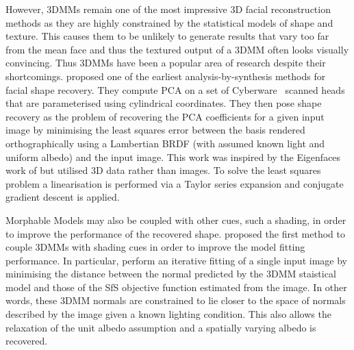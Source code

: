 However, 3DMMs remain one of the most impressive 3D facial reconstruction
methods as they are highly constrained by the statistical models
of shape and texture. This causes them to be unlikely to generate results
that vary too far from the mean face and thus the textured output of a 3DMM
often looks visually convincing. Thus 3DMMs have been a popular area of
research despite their shortcomings.
\cite{atick1996statistical} proposed one of the earliest analysis-by-synthesis
methods for facial shape recovery. They compute PCA on a set of
Cyberware~\cite{cyberware} scanned heads that are parameterised using
cylindrical coordinates. They then pose shape recovery as the problem
of recovering the PCA coefficients for a given input image by minimising
the least squares error between the basis rendered orthographically
using a Lambertian BRDF (with assumed known light and uniform albedo)
and the input image. This work was inspired by the Eigenfaces work of
\citet{Sirovich:1987te} but utilised 3D data rather than images. To solve
the least squares problem a linearisation is performed via a Taylor series
expansion and conjugate gradient descent is applied.

Morphable Models may also be coupled with other cues, such a shading,
in order to improve the performance of the recovered shape.
\citet{patel2012driving} proposed the first method to couple 3DMMs with shading
cues in order to improve the model fitting performance.
In particular, \citet{patel2012driving} perform an iterative fitting of a
single input image by minimising the distance between the normal predicted
by the 3DMM staistical model and those of the SfS objective function
estimated from the image. In other words, these 3DMM normals are constrained
to lie closer to the space of normals described by the image given a known
lighting condition. This also allows the relaxation of the unit albedo assumption
and a spatially varying albedo is recovered.
